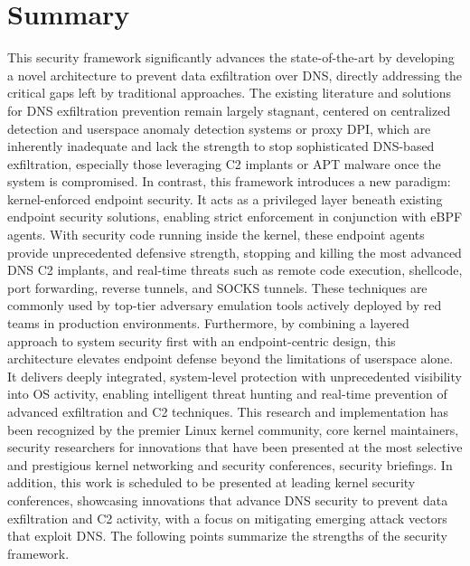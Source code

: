\documentclass [11pt, proquest] {uwthesis}[2020/02/24]
\begin{document}
\section{Summary}
This security framework significantly advances the state-of-the-art by developing a novel architecture to prevent data exfiltration over DNS, directly addressing the critical gaps left by traditional approaches. The existing literature and solutions for DNS exfiltration prevention remain largely stagnant, centered on centralized detection and userspace anomaly detection systems or proxy DPI, which are inherently inadequate and lack the strength to stop sophisticated DNS-based exfiltration, especially those leveraging C2 implants or APT malware once the system is compromised. In contrast, this framework introduces a new paradigm: kernel-enforced endpoint security. It acts as a privileged layer beneath existing endpoint security solutions, enabling strict enforcement in conjunction with eBPF agents. With security code running inside the kernel, these endpoint agents provide unprecedented defensive strength, stopping and killing the most advanced DNS C2 implants, and real-time threats such as remote code execution, shellcode, port forwarding, reverse tunnels, and SOCKS tunnels. These techniques are commonly used by top-tier adversary emulation tools actively deployed by red teams in production environments.
Furthermore, by combining a layered approach to system security first with an endpoint-centric design, this architecture elevates endpoint defense beyond the limitations of userspace alone. It delivers deeply integrated, system-level protection with unprecedented visibility into OS activity, enabling intelligent threat hunting and real-time prevention of advanced exfiltration and C2 techniques. This research and implementation has been recognized by the premier Linux kernel community, core kernel maintainers, security researchers for innovations that have been presented at the most selective and prestigious kernel networking and security conferences, security briefings. In addition, this work is scheduled to be presented at leading kernel security conferences, showcasing innovations that advance DNS security to prevent data exfiltration and C2 activity, with a focus on mitigating emerging attack vectors that exploit DNS. The following points summarize the strengths of the security framework.
\end{document}

